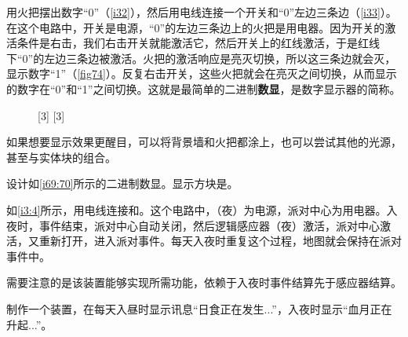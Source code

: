 \begin{example}{}{}
用火把摆出数字“0”（\autoref{i32}），然后用电线连接一个开关和“0”左边三条边（\autoref{i33}）。在这个电路中，开关是电源，“0”的左边三条边上的火把是用电器。因为开关的激活条件是右击，我们右击开关就能激活它，然后开关上的红线激活，于是红线下“0”的左边三条边被激活。火把的激活响应是亮灭切换，所以这三条边就会灭，显示数字“1”（\autoref{fig74}）。反复右击开关，这些火把就会在亮灭之间切换，从而显示的数字在“0”和“1”之间切换。这就是最简单的二进制\textbf{数显}，是数字显示器的简称。

\begin{figure}[H]
\centering
{}%
[3]%
%
[3]%
\caption{}
\label{i32:33}
\end{figure}
\begin{remark*}{}{}
如果想要显示效果更醒目，可以将背景墙和火把都涂上，也可以尝试其他的光源，甚至与实体块的组合。
\end{remark*}
\begin{problem}{}{}
设计如\autoref{i69:70}所示的二进制数显。显示方块是。
\begin{figure}[H]
\centering
{}%
%
\caption{}
\label{i69:70}
\end{figure}
\end{problem}
\end{example}

\begin{example}{}{}
如\autoref{i3:4}所示，用电线连接和。这个电路中，（夜）为电源，派对中心为用电器。入夜时，事件结束，派对中心自动关闭，然后逻辑感应器（夜）激活，派对中心激活，又重新打开，进入派对事件。每天入夜时重复这个过程，地图就会保持在派对事件中。
\begin{figure}[H]
\centering
{}%
%
\caption{}
\label{i3:4}
\end{figure}
\begin{remark*}{}{}
需要注意的是该装置能够实现所需功能，依赖于入夜时事件结算先于感应器结算。
\end{remark*}
\begin{problem}{}{}
制作一个装置，在每天入昼时显示讯息“日食正在发生...”，入夜时显示“血月正在升起...”。
\end{problem}
\end{example}

